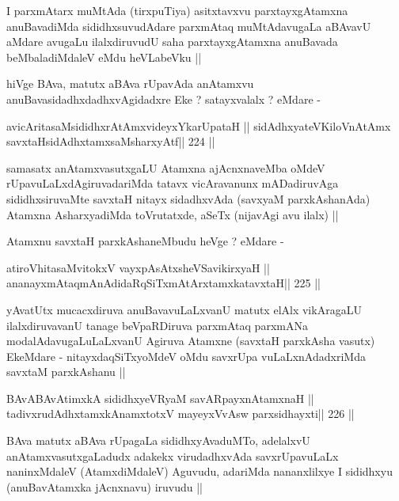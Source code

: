 \begin{artha}
I  parxmAtarx muMtAda (tirxpuTiya) asitxtavxvu parxtayxgAtamxna
anuBavadiMda sididhxsuvudAdare parxmAtaq muMtAdavugaLa aBAvavU aMdare
avugaLu ilalxdiruvudU saha parxtayxgAtamxna anuBavada beMbaladiMdaleV
eMdu heVLabeVku ||
\end{artha}

\begin{artha}
hiVge BAva, matutx aBAva rUpavAda anAtamxvu
anuBavasidadhxdadhxvAgidadxre Eke ? satayxvalalx ? eMdare -
\end{artha}

\begin{shl}
avicAritasaMsididhxrAtAmxvideyxYkarUpataH ||
sidAdhxyateV\s KiloV\s nAtAmx savxtaHsidAdhxtamxsaMsharxyAtf\hfill || 224 ||
\end{shl}

\begin{artha}
samasatx anAtamxvasutxgaLU Atamxna ajAcnxnaveMba oMdeV
rUpavuLaLxdAgiruvadariMda tatavx vicAravanunx mADadiruvAga
sididhxsiruvaMte savxtaH nitayx sidadhxvAda (savxyaM parxkAshanAda)
Atamxna AsharxyadiMda toVrutatxde, aSeTx (nijavAgi avu ilalx) ||

Atamxnu savxtaH parxkAshaneMbudu heVge ? eMdare -
\end{artha}

\begin{shl}
atiroVhitasaMvitokxV vayxpAsAtxsheVSavikirxyaH ||
ananayxmAtaqmAnAdidaRqSiTxmAtArxtamxkatavxtaH\hfill || 225 ||
\end{shl}

\begin{artha}
yAvatUtx mucacxdiruva anuBavavuLaLxvanU matutx elAlx vikAragaLU
ilalxdiruvavanU tanage beVpaRDiruva parxmAtaq parxmANa
modalAdavugaLuLaLxvanU Agiruva Atamxne (savxtaH parxkAsha vasutx)
EkeMdare - nitayxdaqSiTxyoMdeV oMdu savxrUpa vuLaLxnAdadxriMda savxtaM
parxkAshanu ||
\end{artha}

\begin{shl}
BAvABAvAtimxkA sididhxyeVRyaM savAR\s payxnAtamxnaH ||
tadivxrudAdhxtamxkAnamxtotxV mayeyxVvAsw parxsidhayxti\hfill || 226 ||
\end{shl}

\begin{artha}
BAva matutx aBAva rUpagaLa sididhxyAvaduMTo, adelalxvU
anAtamxvasutxgaLadudx adakekx virudadhxvAda savxrUpavuLaLx
naninxMdaleV (AtamxdiMdaleV) Aguvudu, adariMda nananxlilxye I
sididhxyu (anuBavAtamxka jAcnxnavu) iruvudu ||
\end{artha}

